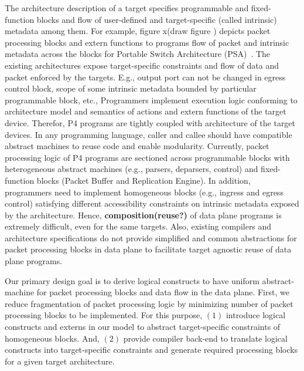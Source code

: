 \documentclass[10pt,sigconf,letterpaper,anonymous]{acmart}
\begin{document}
The architecture description of a target specifies pro\-gram\-ma\-ble and fixed-function blocks and flow of user-defined and target-specific (called intrinsic) metadata among them.
For example, figure x(draw figure ) depicts packet processing blocks and extern functions to programs flow of packet and intrinsic metadata across the blocks for Portable Switch Architecture (PSA)~\cite{psa}. 
The existing architectures expose target-specific constraints and flow of data and packet enforced by the targets.
E.g., output port can not be changed in egress control block, scope of some  intrinsic metadata bounded by particular programmable block, etc.,  
Programmers implement execution logic conforming to architecture model and semantics of actions and extern functions of the target device.
Therefor, P4 programs are tightly coupled with architecture of the target devices.
In any programming language, caller and callee should have compatible abstract machines to reuse code and enable modularity.
Currently, packet processing logic of P4 programs are sectioned across programmable blocks with heterogeneous abstract machines (e.g., parsers, deparsers, control) and fixed-function blocks (Packet Buffer and Replication Engine).
In addition, programmers need to implement homogeneous blocks (e.g., ingress and egress control) satisfying different accessibility constraints on intrinsic metadata exposed by the architecture. 
Hence, \textbf{composition(reuse?)} of data plane programs is extremely difficult, even for the same targets. 
Also, existing compilers and architecture specifications do not provide simplified and common abstractions for packet processing blocks in data plane to facilitate target agnostic reuse of data plane programs.

Our primary design goal is  to derive logical constructs to have uniform abstract-machine for packet processing blocks and data flow in the data plane.
First, we reduce fragmentation of packet processing logic by minimizing number of packet processing blocks to be implemented.
For this purpose, $(1)$ introduce logical constructs and externs in our model to abstract target-specific constraints of homogeneous blocks.
And, $(2)$ provide compiler back-end to translate logical constructs into target-specific constraints and generate required processing blocks for a given target architecture.
\end{document}
